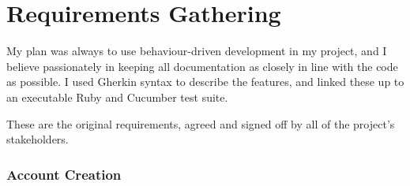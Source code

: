 \chapter{Requirements Gathering}\label{appendix:requirements}

My plan was always to use behaviour-driven development in my project, and I believe passionately in keeping all documentation as closely in line with the code as possible. I used Gherkin syntax to describe the features, and linked these up to an executable Ruby and Cucumber test suite.

These are the original requirements, agreed and signed off by all of the project's stakeholders. %

\subsection{Account Creation}

